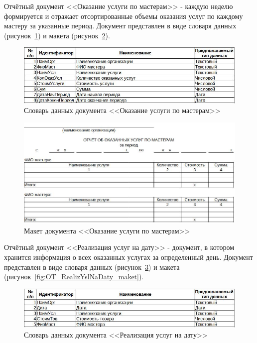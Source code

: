 \documentclass[12pt, a4paper, simple]{eskdtext}
\begin{document}
    Отчётный документ <<Оказание услуги по мастерам>>
    - каждую неделю формируется и отражает отсортированные объемы оказания услуг по каждому мастеру за указанные период.
    Документ представлен в виде словаря данных (рисунок~\ref{fig:OT_OkazYslPoMastery_tipi})
    и макета (рисунок~\ref{fig:OT_OkazYslPoMastery_maket}).

    \begin{figure}[!h]
        \centering
        \includegraphics[width=14cm]
            {_docs/ОТ_ОказУслПоМастеру_типы.jpg}
        \caption{Словарь данных документа <<Оказание услуги по мастерам>>}
        \label{fig:OT_OkazYslPoMastery_tipi}
    \end{figure}

    \begin{figure}[!h]
        \centering
        \includegraphics[width=14cm]
            {_docs/ОТ_ОказУслПоМастеру_макет.jpg}
        \caption{Макет документа <<Оказание услуги по мастерам>>}
        \label{fig:OT_OkazYslPoMastery_maket}
    \end{figure}

    \newpage

    Отчётный документ <<Реализация услуг на дату>>
    - документ, в котором хранится информация о всех оказанных услугах за определенный день.
    Документ представлен в виде словаря данных (рисунок~\ref{fig:OT_RealizYslNaDaty_tipi})
    и макета (рисунок~\ref{fig:OT_RealizYslNaDaty_maket}).

    \begin{figure}[!h]
        \centering
        \includegraphics[width=14cm]
            {_docs/ОТ_РеализУслНаДату_типы.jpg}
        \caption{Словарь данных документа <<Реализация услуг на дату>>}
        \label{fig:OT_RealizYslNaDaty_tipi}
    \end{figure}
\end{document}
